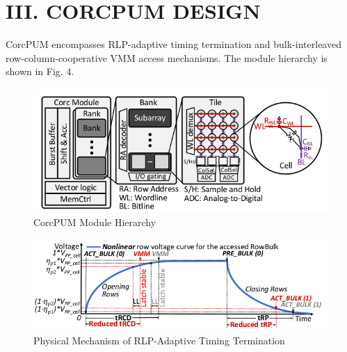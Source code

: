\documentclass{article}
\begin{document}
 	\section*{III. CORCPUM DESIGN}
 		CorcPUM encompasses RLP-adaptive timing termination
 		and bulk-interleaved row-column-cooperative VMM access
 		mechanisms. The module hierarchy is shown in Fig. 4.
 		
 		\begin{figure}[h]
 			\centering
 			\includegraphics[width=0.7\linewidth]{images/fig4}
 			\caption{CorcPUM Module Hierarchy}
 			\label{fig:fig4}
 		\end{figure}
 		
 		\begin{figure}[h]
 			\centering
 			\includegraphics[width=0.7\linewidth]{images/fig5}
 			\caption{Physical Mechanism of RLP-Adaptive Timing Termination}
 			\label{fig:fig5}
 		\end{figure}
 		
\end{document}

